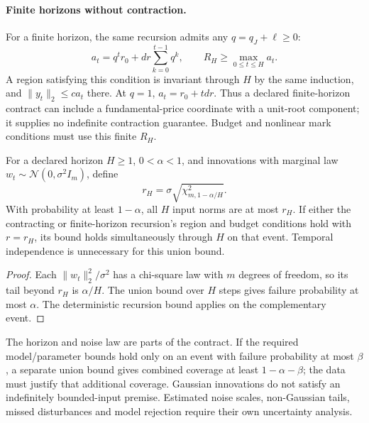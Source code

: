 \paragraph{Finite horizons without contraction.}
For a finite horizon, the same recursion admits any $q=q_J+\ell\ge0$:
\[
a_t=q^t r_0+dr\sum_{k=0}^{t-1}q^k,\qquad
R_H\ge\max_{0\le t\le H}a_t.
\]
A region satisfying this condition is invariant through $H$ by the same induction, and $\|y_t\|_2\le c a_t$ there. At $q=1$, $a_t=r_0+tdr$. Thus a declared finite-horizon contract can include a fundamental-price coordinate with a unit-root component; it supplies no indefinite contraction guarantee. Budget and nonlinear mark conditions must use this finite $R_H$.

\begin{proposition}
\label{prop:finite_gaussian_risk}
For a declared horizon $H\ge1$, $0<\alpha<1$, and innovations with marginal law $w_t\sim\mathcal N(0,\sigma^2 I_m)$, define
\[
r_H=\sigma\sqrt{\chi^2_{m,1-\alpha/H}}.
\]
With probability at least $1-\alpha$, all $H$ input norms are at most $r_H$. If either the contracting or finite-horizon recursion's region and budget conditions hold with $r=r_H$, its bound holds simultaneously through $H$ on that event. Temporal independence is unnecessary for this union bound.
\end{proposition}
\begin{proof}
Each $\|w_t\|_2^2/\sigma^2$ has a chi-square law with $m$ degrees of freedom, so its tail beyond $r_H$ is $\alpha/H$. The union bound over $H$ steps gives failure probability at most $\alpha$. The deterministic recursion bound applies on the complementary event.
\end{proof}
The horizon and noise law are parts of the contract. If the required model/parameter bounds hold only on an event with failure probability at most $\beta$, a separate union bound gives combined coverage at least $1-\alpha-\beta$; the data must justify that additional coverage. Gaussian innovations do not satisfy an indefinitely bounded-input premise. Estimated noise scales, non-Gaussian tails, missed disturbances and model rejection require their own uncertainty analysis.

